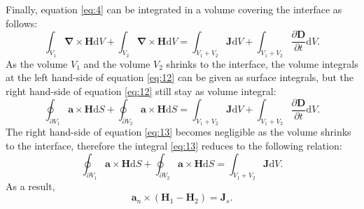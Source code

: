 \documentclass[11pt]{amsart}
\begin{document}
Finally, equation \ref{eq:4} can be integrated in a volume covering the interface as follows:
\begin{equation}
\label{eq:12}
\int_{V_1} \mathbf{\nabla}\times \mathbf{H} \mathrm{d} V + \int_{V_2} \mathbf{\nabla}\times \mathbf{H} \mathrm{d} V=\int_{V_1+V_2} \mathbf{J} \mathrm{d} V+\int_{V_1+V_2} \frac{\partial \mathbf{D}}{\partial t} \mathrm{d} V.
\end{equation}
As the volume $V_1$ and the volume $V_2$ shrinks to the interface, the volume integrals at the left hand-side of equation \ref{eq:12} can be given as surface integrals, but the right hand-side of equation \ref{eq:12} still stay as volume integral:
\begin{equation}
\label{eq:13}
\oint_{\partial V_1} \mathbf{\mathbf{a}}\times \mathbf{H} \mathrm{d} S + \oint_{\partial V_2} \mathbf{\mathbf{a}}\times \mathbf{H} \mathrm{d} S=\int_{V_1+V_2} \mathbf{J} \mathrm{d} V+\int_{V_1+V_2} \frac{\partial \mathbf{D}}{\partial t} \mathrm{d} V.
\end{equation}
The right hand-side of equation \ref{eq:13} becomes negligible as the volume shrinks to the interface, therefore the integral \ref{eq:13} reduces to the following relation:
\begin{equation}
\label{eq:14}
\oint_{\partial V_1} \mathbf{\mathbf{a}}\times \mathbf{H} \mathrm{d} S + \oint_{\partial V_2} \mathbf{\mathbf{a}}\times \mathbf{H} \mathrm{d} S=\int_{V_1+V_2} \mathbf{J} \mathrm{d} V.
\end{equation}
As a result,
\begin{equation*}
\mathbf{a}_{n}\times(\mathbf{H}_{1}-\mathbf{H}_{2})=\mathbf{J}_s.
\end{equation*}



\end{document}
